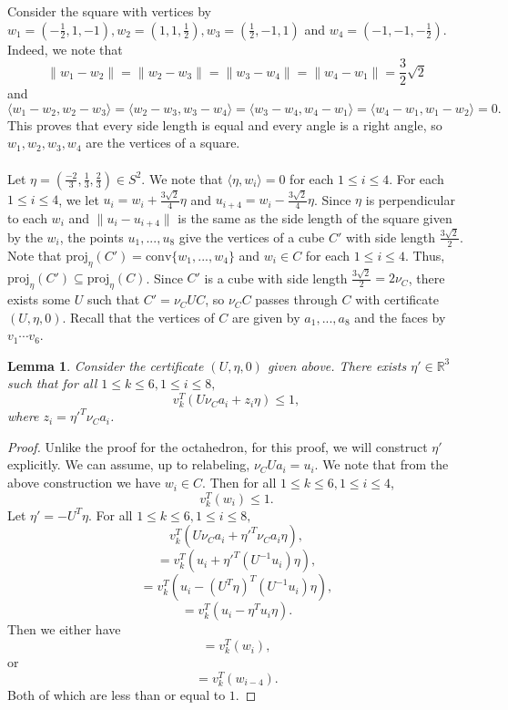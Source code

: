 \documentclass[a4paper]{amsart}
\newtheorem{lem}[thm]{Lemma}
\theoremstyle{remark}
\begin{document}
\noindent
Consider the square with vertices by $w_1=(-\frac{1}{2},1,-1),w_2=(1,1,\frac{1}{2}),w_3=(\frac{1}{2},-1,1)$ and $w_4=(-1,-1,-\frac{1}{2})$. Indeed, we note that $$\|w_1-w_2\|=\|w_2-w_3\|=\|w_3-w_4\|=\|w_4-w_1\|=\frac{3}{2}\sqrt{2}$$ and $$\langle w_1-w_2,w_2-w_3\rangle=\langle w_2-w_3,w_3-w_4\rangle = \langle w_3-w_4,w_4-w_1\rangle = \langle w_4 -w_1, w_1-w_2\rangle=0.$$ This proves that every side length is equal and every angle is a right angle, so $w_1,w_2,w_3,w_4$ are the vertices of a square.
\\\\
Let $\eta = \left( \frac{-2}{3},\frac{1}{3}, \frac{2}{3} \right) \in S^2$. We note that $\langle\eta,w_i\rangle=0$ for each $1\leq i \leq4$. For each $1\leq i\leq 4$, we let $u_i=w_i+\frac{3\sqrt2}{4}\eta$ and $u_{i+4}=w_i-\frac{3\sqrt2}{4}\eta$. Since $\eta$ is perpendicular to each $w_i$ and $\|u_i-u_{i+4}\|$ is the same as the side length of the square given by the $w_i$, the points $u_1,...,u_8$ give the vertices of a cube $C'$ with side length $\frac{3\sqrt2}{2}$. Note that $\textrm{proj}_\eta(C')=\textrm{conv}\{w_1,...,w_4\}$ and $w_i\in C$ for each $1\leq i\leq4$. Thus, $\textrm{proj}_\eta(C')\subseteq \textrm{proj}_\eta(C)$. Since $C'$ is a cube with side length $\frac{3\sqrt2}{2}=2\nu_C$, there exists some $U$ such that $C'=\nu_C UC$, so $\nu_CC$ passes through $C$ with certificate $(U,\eta,0)$. Recall that the vertices of $C$ are given by $a_1 ,...,a_8$ and the faces by $v_1 \cdots v_6$.
\begin{lem} \label{lem:vc_passthrough}
	Consider the certificate $(U,\eta,0)$ given above. There exists $\eta'\in\mathbb{R}^3$ such that for all $1 \leq k \leq 6,1 \leq i \leq 8,$
	$$v_{k}^T(U\nu_Ca_i+z_i\eta)\leq 1,$$
    where $z_i = \eta'^T\nu_Ca_i$.
\end{lem}
\begin{proof}
 Unlike the proof for the octahedron, for this proof, we will construct $\eta'$ explicitly. We can assume, up to relabeling, $\nu_CUa_i=u_i$. We note that from the above construction we have $w_i\in C$. Then for all $1 \leq k \leq 6, 1 \leq i \leq 4$,
	$$v_{k}^T(w_i)\leq 1.$$
	Let $\eta'=-U^T\eta$. For all $1 \leq k \leq 6, 1 \leq i \leq 8,$
	$$v_{k}^T(U\nu_Ca_i+\eta'^T\nu_Ca_i\eta),$$
    $$=v_{k}^T(u_i+\eta'^T(U^{-1}u_i)\eta),$$
	$$=v_{k}^T(u_i-(U^T\eta)^T(U^{-1}u_i)\eta),$$
	$$=v_{k}^T(u_i-\eta^Tu_i\eta).$$
    Then we either have
	$$=v_{k}^T(w_i),$$
    or
    $$=v_k^T(w_{i-4}).$$
    Both of which are less than or equal to $1$.
\end{proof}
\end{document}
